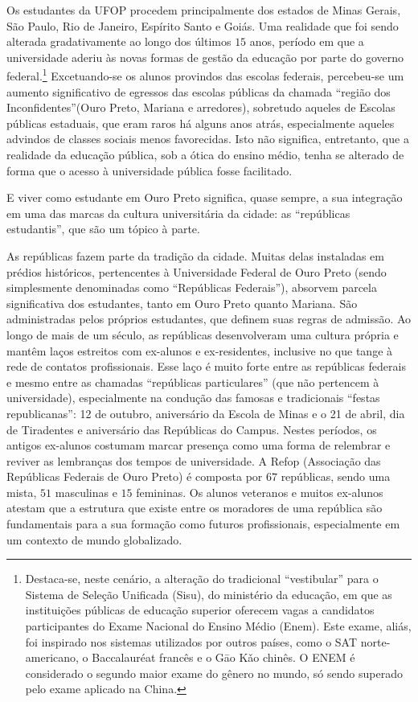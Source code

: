 Os estudantes da UFOP procedem principalmente dos estados de Minas Gerais, São Paulo, Rio de Janeiro, Espírito Santo e Goiás. Uma realidade que foi sendo alterada gradativamente ao longo dos últimos $15$ anos, período em que a universidade aderiu às novas formas de gestão da educação por parte do governo federal.\footnote{Destaca-se, neste cenário, a alteração do tradicional ``vestibular'' para o Sistema de Seleção Unificada (Sisu), do ministério da educação, em que  as instituições públicas de educação superior oferecem vagas a candidatos participantes do Exame Nacional do Ensino Médio (Enem). Este exame, aliás, foi inspirado nos sistemas utilizados por outros países, como o SAT norte-americano, o Baccalauréat francês e o Gāo Kǎo chinês. O ENEM é considerado o segundo maior exame do gênero no mundo, só sendo superado pelo exame aplicado na China.} Excetuando-se os alunos provindos das escolas federais, percebeu-se um aumento significativo de egressos das escolas públicas da chamada ``região dos Inconfidentes''(Ouro Preto, Mariana e arredores), sobretudo aqueles de Escolas públicas estaduais, que eram raros há alguns anos atrás, especialmente aqueles advindos de classes sociais menos favorecidas. Isto não significa, entretanto, que a realidade da educação pública, sob a ótica do ensino médio, tenha se alterado de forma que o acesso à universidade pública fosse facilitado.

E viver como estudante em Ouro Preto significa, quase sempre, a sua integração em uma das marcas da cultura universitária da cidade: as ``repúblicas estudantis'', que são um tópico à parte.

As repúblicas fazem parte da tradição da cidade. Muitas delas instaladas em prédios históricos, pertencentes à Universidade Federal de Ouro Preto (sendo simplesmente denominadas como ``Repúblicas Federais''), absorvem parcela significativa dos estudantes, tanto em Ouro Preto quanto Mariana. São administradas pelos próprios estudantes, que definem suas regras de admissão. Ao longo de mais de um século, as repúblicas desenvolveram uma cultura própria e mantêm laços estreitos com ex-alunos e ex-residentes, inclusive no que tange à rede de contatos profissionais. Esse laço é muito forte entre as repúblicas federais e mesmo entre as chamadas ``repúblicas particulares'' (que não pertencem à universidade), especialmente na condução das famosas e tradicionais ``festas republicanas'': 12 de outubro, aniversário da Escola de Minas e o 21 de abril, dia de Tiradentes e aniversário das Repúblicas do Campus. Nestes períodos, os antigos ex-alunos costumam marcar presença como uma forma de relembrar e reviver as lembranças dos tempos de universidade. A Refop (Associação das Repúblicas Federais de Ouro Preto) é composta por $67$ repúblicas, sendo uma mista, $51$ masculinas e $15$ femininas. Os alunos veteranos e muitos ex-alunos atestam que a estrutura que existe entre os moradores de uma república são fundamentais para a sua formação como futuros profissionais, especialmente em um contexto de mundo globalizado.
%
